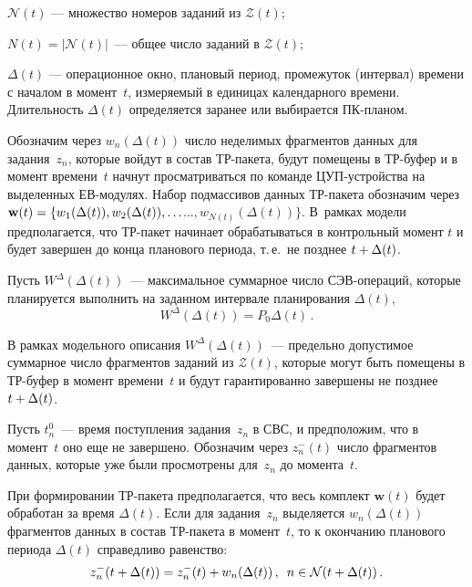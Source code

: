 \begin{multicols}{2}
$\mathcal{N}(t)$ --- множество   номеров заданий из $\mathcal{Z}(t)$;

$N(t) = |\mathcal{N}(t)|$~--- общее число заданий в $\mathcal{Z}(t)$;

$\Delta(t)$ --- операционное окно, плановый период, промежуток
(интервал) времени с началом в момент~$t$, измеряемый в единицах
календарного времени.  Длительность $\Delta(t)$  определяется
заранее или выбирается   ПК-планом.


 Обозначим через
$w_{n}(\Delta(t))$ число неделимых фрагментов данных для задания~$z_{n}$, 
кото\-рые войдут в состав ТР-па\-ке\-та, будут помещены в
\mbox{ТР-бу\-фер} и в момент времени~$t$ начнут просматри\-вать\-ся по команде
ЦУП-устрой\-ст\-ва на выделенных ЕВ-мо\-ду\-лях. Набор подмассивов данных
ТР-па\-ке\-та  обозначим через $ \textbf{w}(t) \hm= \{ w_{1}(\Delta(t)),
w_{2}(\Delta(t)), \ldots$\linebreak $\ldots , w_{N(t)}(\Delta(t))\}$. В~рамках модели
предполагается, что ТР-па\-кет начинает обрабатываться в контрольный
момент $t$ и будет завершен до конца планового периода, т.\,е.\ не
позднее  $t \hm+ \Delta(t)$.

Пусть $W^{\Delta} (\Delta(t))$~--- максимальное суммарное число
СЭВ-опе\-ра\-ций, которые планируется выполнить на заданном интервале
планирования $ \Delta(t)$,
$$
W^{\Delta} (\Delta(t)) = P_0 \Delta(t)\,.
$$

В рамках модельного описания $W^{\Delta} (\Delta(t))$~--- предельно
допустимое суммарное число фрагментов заданий из $\mathcal{Z}(t)$, которые
могут быть помещены в ТР-бу\-фер в момент времени~$t$ и будут
гарантированно  завершены не позднее  $t \hm+ \Delta(t)$.

Пусть $t_n^0$~--- время поступления задания~$z_n$ в СВС, и
предположим, что в момент~$t$ оно еще не завершено. Обозначим через
$z^-_{n}(t)$ число фрагментов данных, которые уже были просмотрены
для~$z_n$   до момента~$t$.

При формировании  ТР-па\-ке\-та предполагается, что весь комплект
$\textbf{w} (t)$ будет  обработан за время $\Delta(t)$. Если для
задания~$z_{n}$ выделяется  $w_{n}(\Delta(t))$ фрагментов данных в
состав ТР-па\-ке\-та   в момент~$t$, то к окончанию планового периода
$\Delta(t)$ справедливо равенство:
$$
z^-_{n}(t + \Delta(t))= z^-_{n}(t) + w_{n}(\Delta(t))\,,\enskip n \in \mathcal{N}(t + \Delta(t))\,. 
$$



\end{multicols}
